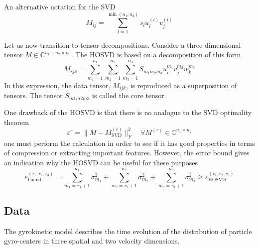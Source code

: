\documentclass[GeometricDeepLearning/sections/Kurdyukova2021Lab8/main.tex]{subfiles}
\begin{document}
An alternative notation for the SVD 
    \[ M_{ij} = \sum_{l = 1}^{\min(n_1, n_2)} s_lu_i^{(l)}v_j^{(l)} \]
    

Let us now transition to tensor decompositions. Consider a three dimensional tensor $M \in \mathbb{C}^{n_1\times n_2\times n_3}$. The HOSVD is based on a decomposition of this form
    \[  M_{ijk} = \sum_{m_1 = 1}^{n_1}\sum_{m_2 = 1}^{n_2}\sum_{m_3 = 1}^{n_3} S_{m_1m_2m_3}u_i^{m_1}v_j^{m_2}w_k^{m_3}\]
In this expression, the data tensor, $M_{ijk}$, is reproduced as a superposition of tensors. The tensor $S_{m1m2m3}$ is called the core tensor.


One drawback of the HOSVD is that there is no analogue to the SVD optimality theorem
    \[ \varepsilon^{r} = \| M - M_{\text{SVD}}^{(r)} \|_F^2 \quad \forall M^{(r)}\in \mathbb{C}^{n_1\times n_2} \]
one must perform the calculation in order to see if it has good properties in terms of compression or extracting important features.
However, the error bound gives an indication why the HOSVD can be useful for these purposes
    \[ \varepsilon_{\text{bound}}^{(r_1, r_2, r_3)} = \sum_{m_1 = r_1 + 1}^{n_1}\sigma_{m_1}^2 + \sum_{m_2 = r_2 + 1}^{n_2}\sigma_{m_2}^2 + \sum_{m_3 = r_3 + 1}^{n_3}\sigma_{m_3}^2 \geq \varepsilon_{\text{HOSVD}}^{(r_1, r_2, r_3)}  \]





\subsection{Data}

The gyrokinetic model describes the time evolution of the distribution of particle gyro-centers in three spatial and two velocity dimensions.

\end{document}
